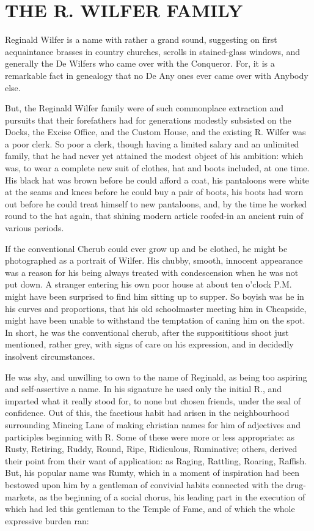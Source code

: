 
\chapter{THE R. WILFER FAMILY}


Reginald Wilfer is a name with rather a grand sound, suggesting on
first acquaintance brasses in country churches, scrolls in stained-glass
windows, and generally the De Wilfers who came over with the Conqueror.
For, it is a remarkable fact in genealogy that no De Any ones ever came
over with Anybody else.

But, the Reginald Wilfer family were of such commonplace extraction and
pursuits that their forefathers had for generations modestly subsisted
on the Docks, the Excise Office, and the Custom House, and the existing
R. Wilfer was a poor clerk. So poor a clerk, though having a limited
salary and an unlimited family, that he had never yet attained the
modest object of his ambition: which was, to wear a complete new suit
of clothes, hat and boots included, at one time. His black hat was brown
before he could afford a coat, his pantaloons were white at the seams
and knees before he could buy a pair of boots, his boots had worn out
before he could treat himself to new pantaloons, and, by the time he
worked round to the hat again, that shining modern article roofed-in an
ancient ruin of various periods.

If the conventional Cherub could ever grow up and be clothed, he might
be photographed as a portrait of Wilfer. His chubby, smooth, innocent
appearance was a reason for his being always treated with condescension
when he was not put down. A stranger entering his own poor house at
about ten o’clock P.M. might have been surprised to find him sitting up
to supper. So boyish was he in his curves and proportions, that his
old schoolmaster meeting him in Cheapside, might have been unable to
withstand the temptation of caning him on the spot. In short, he was
the conventional cherub, after the supposititious shoot just mentioned,
rather grey, with signs of care on his expression, and in decidedly
insolvent circumstances.

He was shy, and unwilling to own to the name of Reginald, as being too
aspiring and self-assertive a name. In his signature he used only the
initial R., and imparted what it really stood for, to none but chosen
friends, under the seal of confidence. Out of this, the facetious habit
had arisen in the neighbourhood surrounding Mincing Lane of making
christian names for him of adjectives and participles beginning with R.
Some of these were more or less appropriate: as Rusty, Retiring, Ruddy,
Round, Ripe, Ridiculous, Ruminative; others, derived their point from
their want of application: as Raging, Rattling, Roaring, Raffish. But,
his popular name was Rumty, which in a moment of inspiration had been
bestowed upon him by a gentleman of convivial habits connected with the
drug-markets, as the beginning of a social chorus, his leading part in
the execution of which had led this gentleman to the Temple of Fame, and
of which the whole expressive burden ran:

